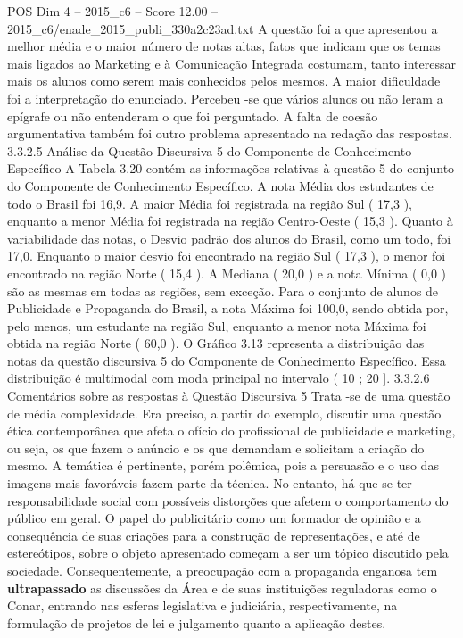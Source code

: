 \begin{textsample}{POS Dim 4 – 2015\_c6 – Score 12.00 – 2015\_c6/enade\_2015\_publi\_330a2c23ad.txt}
A questão foi a que apresentou a melhor média e o maior número de notas altas, fatos que indicam que os temas mais ligados ao Marketing e à Comunicação Integrada costumam, tanto interessar mais os alunos como serem mais conhecidos pelos mesmos.
A maior dificuldade foi a interpretação do enunciado.
Percebeu -se que vários alunos ou não leram a epígrafe ou não entenderam o que foi perguntado.
A falta de coesão argumentativa também foi outro problema apresentado na redação das respostas. 3.3.2.5 Análise da Questão Discursiva 5 do Componente de Conhecimento Específico A Tabela 3.20 contém as informações relativas à questão 5 do conjunto do Componente de Conhecimento Específico.
A nota Média dos estudantes de todo o Brasil foi 16,9.
A maior Média foi registrada na região Sul ( 17,3 ), enquanto a menor Média foi registrada na região Centro-Oeste ( 15,3 ).
Quanto à variabilidade das notas, o Desvio padrão dos alunos do Brasil, como um todo, foi 17,0.
Enquanto o maior desvio foi encontrado na região Sul ( 17,3 ), o menor foi encontrado na região Norte ( 15,4 ).
A Mediana ( 20,0 ) e a nota Mínima ( 0,0 ) são as mesmas em todas as regiões, sem exceção.
Para o conjunto de alunos de Publicidade e Propaganda do Brasil, a nota Máxima foi 100,0, sendo obtida por, pelo menos, um estudante na região Sul, enquanto a menor nota Máxima foi obtida na região Norte ( 60,0 ).
O Gráfico 3.13 representa a distribuição das notas da questão discursiva 5 do Componente de Conhecimento Específico.
Essa distribuição é multimodal com moda principal no intervalo ( 10 ; 20 ]. 3.3.2.6 Comentários sobre as respostas à Questão Discursiva 5 Trata -se de uma questão de média complexidade.
Era preciso, a partir do exemplo, discutir uma questão ética contemporânea que afeta o ofício do profissional de publicidade e marketing, ou seja, os que fazem o anúncio e os que demandam e solicitam a criação do mesmo.
A temática é pertinente, porém polêmica, pois a persuasão e o uso das imagens mais favoráveis fazem parte da técnica.
No entanto, há que se ter responsabilidade social com possíveis distorções que afetem o comportamento do público em geral.
O papel do publicitário como um formador de opinião e a consequência de suas criações para a construção de representações, e até de estereótipos, sobre o objeto apresentado começam a ser um tópico discutido pela sociedade.
Consequentemente, a preocupação com a propaganda enganosa tem \textbf{ultrapassado} as discussões da Área e de suas instituições reguladoras como o Conar, entrando nas esferas legislativa e judiciária, respectivamente, na formulação de projetos de lei e julgamento quanto a aplicação destes.

\end{textsample}
